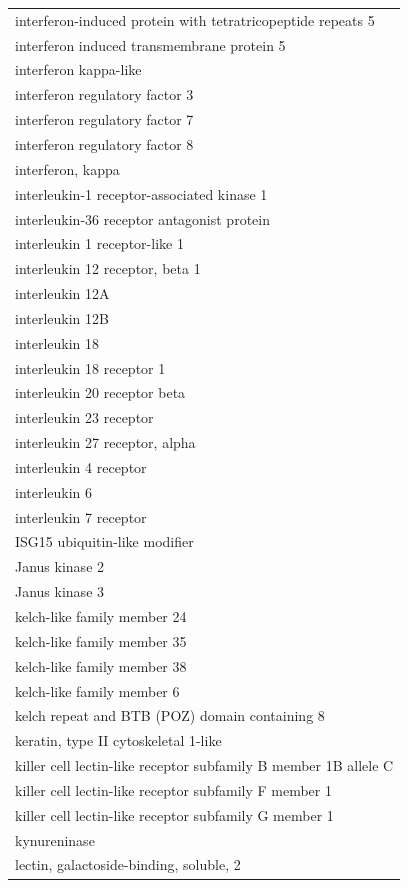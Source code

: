 \documentclass[english]{article}\usepackage[]{graphicx}\usepackage[]{color}
\begin{document}
\begin{longtable}{l}
interferon-induced protein with tetratricopeptide repeats 5 \\ 
interferon induced transmembrane protein 5 \\ 
interferon kappa-like \\ 
interferon regulatory factor 3 \\ 
interferon regulatory factor 7 \\ 
interferon regulatory factor 8 \\ 
interferon, kappa \\ 
interleukin-1 receptor-associated kinase 1 \\ 
interleukin-36 receptor antagonist protein \\ 
interleukin 1 receptor-like 1 \\ 
interleukin 12 receptor, beta 1 \\ 
interleukin 12A \\ 
interleukin 12B \\ 
interleukin 18 \\ 
interleukin 18 receptor 1 \\ 
interleukin 20 receptor beta \\ 
interleukin 23 receptor \\ 
interleukin 27 receptor, alpha \\ 
interleukin 4 receptor \\ 
interleukin 6 \\ 
interleukin 7 receptor \\ 
ISG15 ubiquitin-like modifier \\ 
Janus kinase 2 \\ 
Janus kinase 3 \\ 
kelch-like family member 24 \\ 
kelch-like family member 35 \\ 
kelch-like family member 38 \\ 
kelch-like family member 6 \\ 
kelch repeat and BTB (POZ) domain containing 8 \\ 
keratin, type II cytoskeletal 1-like \\ 
killer cell lectin-like receptor subfamily B member 1B allele C \\ 
killer cell lectin-like receptor subfamily F member 1 \\ 
killer cell lectin-like receptor subfamily G member 1 \\ 
kynureninase \\ 
lectin, galactoside-binding, soluble, 2 \\ 

\end{longtable}
\end{document}
